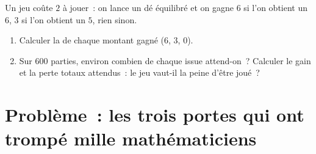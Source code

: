 \begin{exercise}[$\star\star\star$]\label{exo:g10:proba:9}
Un jeu coûte $2$ à jouer~: on lance un dé équilibré et on gagne $6$ si
l'on obtient un $6$, $3$ si l'on obtient un $5$, rien sinon.
\begin{enumerate}
  \item Calculer la  de chaque montant gagné ($6$, $3$, $0$).
  \item Sur $600$ parties, environ combien de chaque issue attend-on~?
        Calculer le gain et la perte totaux attendus~: le jeu vaut-il la
        peine d'être joué~?
\end{enumerate}
\end{exercise}

\section{Problème~: les trois portes qui ont trompé mille
mathématiciens}

